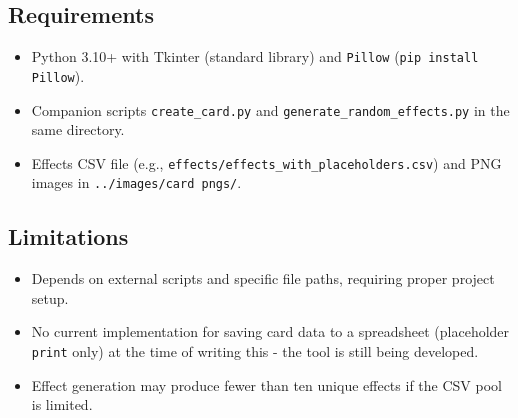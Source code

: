 \subsection{Requirements}
\begin{itemize}
	\item Python 3.10+ with Tkinter (standard library) and \texttt{Pillow} (\texttt{pip install Pillow}).
	\item Companion scripts \texttt{create\_card.py} and \texttt{generate\_random\_effects.py} in the same directory.
	\item Effects CSV file (e.g., \texttt{effects/effects\_with\_placeholders.csv}) and PNG images in \texttt{../images/card pngs/}.
\end{itemize}

\subsection{Limitations}
\begin{itemize}
	\item Depends on external scripts and specific file paths, requiring proper project setup.
	\item No current implementation for saving card data to a spreadsheet (placeholder \texttt{print} only) at the time of writing this - the tool is still being developed.
	\item Effect generation may produce fewer than ten unique effects if the CSV pool is limited.
\end{itemize}